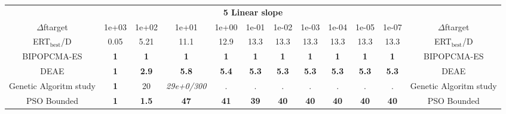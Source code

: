 \begin{tabular}{cccccccccccc}
 & \multicolumn{10}{c}{{\normalsize \textbf{5 Linear slope}}}\\
$\Delta$ftarget& 1e+03& 1e+02& 1e+01& 1e+00& 1e-01& 1e-02& 1e-03& 1e-04& 1e-05& 1e-07 & $\Delta$ftarget \\
ERT$_{\textrm{best}}$/D& 0.05& 5.21& 11.1& 12.9& 13.3& 13.3& 13.3& 13.3& 13.3& 13.3 & ERT$_{\textrm{best}}$/D \\
\hline
BIPOPCMA-ES & \textbf{1} & \textbf{1} & \textbf{1} & \textbf{1} & \textbf{1} & \textbf{1} & \textbf{1} & \textbf{1} & \textbf{1} & \textbf{1} & BIPOPCMA-ES \cite{add_an_entry_for_BIPOPCMA-ES_in_bbob.bib}\\
DEAE & \textbf{1} & \textbf{2.9} & \textbf{5.8} & \textbf{5.4} & \textbf{5.3} & \textbf{5.3} & \textbf{5.3} & \textbf{5.3} & \textbf{5.3} & \textbf{5.3} & DEAE \cite{add_an_entry_for_DEAE_in_bbob.bib}\\
Genetic Algoritm study & \textbf{1} & 20 & \textit{29e+0}\textit{/300} & . & . & . & . & . & . & . & Genetic Algoritm study \cite{add_an_entry_for_Genetic Algoritm study_in_bbob.bib}\\
PSO Bounded & \textbf{1} & \textbf{1.5} & \textbf{47} & \textbf{41} & \textbf{39} & \textbf{40} & \textbf{40} & \textbf{40} & \textbf{40} & \textbf{40} & PSO Bounded \cite{add_an_entry_for_PSO Bounded_in_bbob.bib}
\end{tabular}
